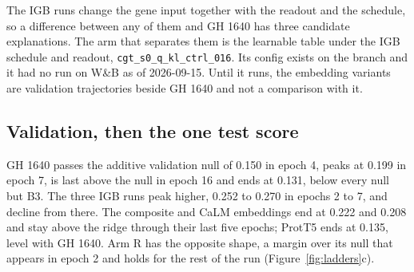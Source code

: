 The IGB runs change the gene input together with the readout and the schedule, so a
difference between any of them and GH 1640 has three candidate explanations. The
arm that separates them is the learnable table under the IGB schedule and readout,
\texttt{cgt\_s0\_q\_kl\_ctrl\_016}. Its config exists on the branch and it had no
run on W\&B as of 2026-09-15. Until it runs, the embedding variants are validation
trajectories beside GH 1640 and not a comparison with it.

\begin{table}[htbp]
\centering
\footnotesize
\caption{The four arm Q runs by their validation trajectory. Epochs is the number
logged.}
\label{tab:disjointruns}

\end{table}

\subsection{Validation, then the one test score}


GH 1640 passes the additive validation null of 0.150 in epoch 4, peaks at 0.199 in
epoch 7, is last above the null in epoch 16 and ends at 0.131, below every null but
B3. The three IGB runs peak higher, 0.252 to 0.270 in epochs 2 to 7, and decline
from there. The composite and CaLM embeddings end at 0.222 and 0.208 and stay above
the ridge through their last five epochs; ProtT5 ends at 0.135, level with GH 1640.
Arm R has the opposite shape, a margin over its null that appears in epoch 2 and
holds for the rest of the run (Figure~\ref{fig:ladders}c).

